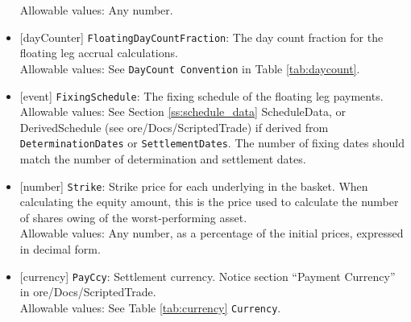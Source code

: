 \begin{itemize}
  Allowable values: Any number.
  \item{}[dayCounter] \lstinline!FloatingDayCountFraction!: The day count fraction for the floating leg accrual
  calculations. \\
  Allowable values: See \lstinline!DayCount Convention! in Table \ref{tab:daycount}.
  \item{}[event] \lstinline!FixingSchedule!: The fixing schedule of the floating leg payments. \\
  Allowable values: See Section \ref{ss:schedule_data} ScheduleData, or DerivedSchedule (see ore/Docs/ScriptedTrade) if
  derived from \lstinline!DeterminationDates! or \lstinline!SettlementDates!. The number of fixing dates should
  match the number of determination and settlement dates.
  \item{}[number] \lstinline!Strike!: Strike price for each underlying in the basket. When calculating the equity amount,
  this is the price used to calculate the number of shares owing of the worst-performing asset. \\
  Allowable values: Any number, as a percentage of the initial prices, expressed in decimal form.
  \item{}[currency] \lstinline!PayCcy!: Settlement currency. Notice section ``Payment Currency'' in ore/Docs/ScriptedTrade. \\
  Allowable values: See Table \ref{tab:currency} \lstinline!Currency!.
\end{itemize}
